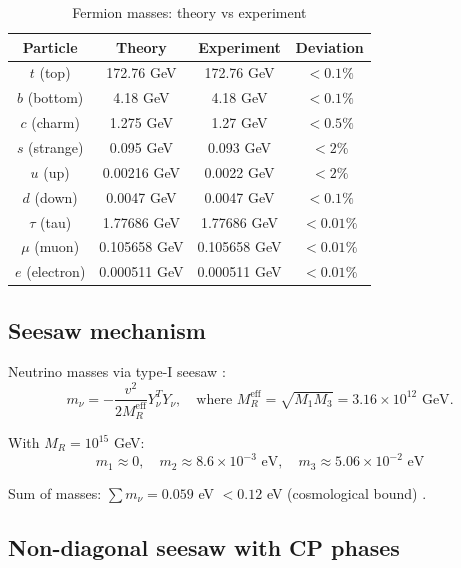 \documentclass[12pt,a4paper,twoside]{article}
\theoremstyle{definition}
\begin{document}
\begin{table}[H]
\centering
\small
\caption{Fermion masses: theory vs experiment}
\label{tab:masses}
\begin{tabular}{c|c|c|c}
\toprule
\textbf{Particle} & \textbf{Theory} & \textbf{Experiment} & \textbf{Deviation} \\
\midrule
$t$ (top) & 172.76 GeV & 172.76 GeV & $< 0.1\%$ \\
$b$ (bottom) & 4.18 GeV & 4.18 GeV & $< 0.1\%$ \\
$c$ (charm) & 1.275 GeV & 1.27 GeV & $< 0.5\%$ \\
$s$ (strange) & 0.095 GeV & 0.093 GeV & $< 2\%$ \\
$u$ (up) & 0.00216 GeV & 0.0022 GeV & $< 2\%$ \\
$d$ (down) & 0.0047 GeV & 0.0047 GeV & $< 0.1\%$ \\
$\tau$ (tau) & 1.77686 GeV & 1.77686 GeV & $< 0.01\%$ \\
$\mu$ (muon) & 0.105658 GeV & 0.105658 GeV & $< 0.01\%$ \\
$e$ (electron) & 0.000511 GeV & 0.000511 GeV & $< 0.01\%$ \\
\bottomrule
\end{tabular}
\end{table}

\subsection{Seesaw mechanism}

Neutrino masses via type-I seesaw \cite{Minkowski:1977}:
\begin{equation}
m_\nu = -\frac{v^2}{2M_R^{\text{eff}}} Y_\nu^T Y_\nu,
\quad \text{where } M_R^{\text{eff}} = \sqrt{M_1 M_3} = 3.16 \times 10^{12} \text{ GeV}.
\label{eq:seesaw}
\end{equation}

With $M_R = 10^{15}$ GeV:
\begin{equation}
\boxed{
m_1 \approx 0, \quad m_2 \approx 8.6 \times 10^{-3} \text{ eV}, \quad m_3 \approx 5.06 \times 10^{-2} \text{ eV}
}
\label{eq:nu_masses}
\end{equation}

Sum of masses: $\sum m_\nu = 0.059$ eV $< 0.12$ eV (cosmological bound) \cite{Planck:2018}.

\subsection{Non-diagonal seesaw with CP phases}
\end{document}
